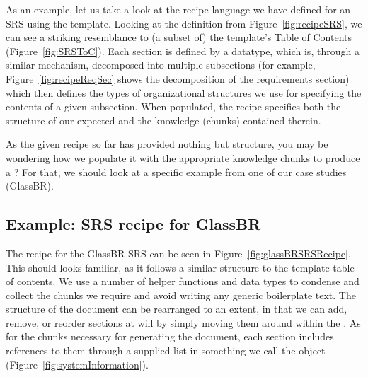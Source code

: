 
As an example, let us take a look at the recipe language we have defined 
 for an SRS using the \smithea{} template.
Looking at the  definition from Figure~\ref{fig:recipeSRS}, 
we can see a striking resemblance to (a subset of) the template's 
Table of Contents (Figure~\ref{fig:SRSToC}). Each section is defined by a 
datatype, which is, through a similar mechanism, decomposed into multiple 
subsections (for example, Figure~\ref{fig:recipeReqSec} shows the decomposition 
of the requirements section) which then defines the types of organizational 
structures we use for specifying the contents of a given subsection. When 
populated, the recipe specifies both the structure of our expected \sf{} and 
the knowledge (chunks) contained therein.


As the given recipe so far has provided nothing but structure, you may be 
wondering how we populate it with the appropriate knowledge chunks to produce a 
\sf{}? For that, we should look at a specific example from one of our case 
studies (GlassBR).

\subsection{Example: SRS recipe for GlassBR}


The recipe for the GlassBR SRS can be seen in Figure~\ref{fig:glassBRSRSRecipe}.
This should looks familiar, as it follows a similar structure to the \smithea{} 
template table of contents. We use a number of helper functions and data types 
to condense and collect the chunks we require and avoid writing any generic 
boilerplate text. The structure of the document can be rearranged to an extent, 
in that we can add, remove, or reorder sections at will by simply moving them 
around within the . As for the chunks necessary for generating 
the document, each section includes references to them through a supplied list 
in something we call the  object 
(Figure~\ref{fig:systemInformation}).

